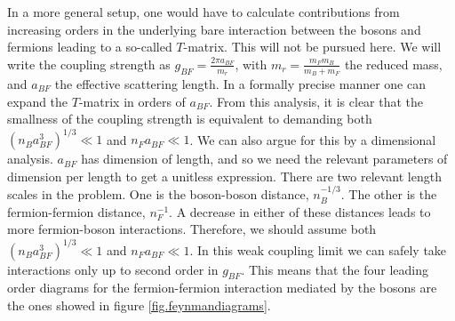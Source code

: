 In a more general setup, one would have to calculate contributions from increasing orders in the underlying bare interaction between the bosons and fermions leading to a so-called $T$-matrix. This will not be pursued here. We will write the coupling strength as $g_{BF} = \frac{2\pi a_{BF}}{m_r}$, with $m_r = \frac{m_Fm_B}{m_B + m_F}$ the reduced mass, and $a_{BF}$ the effective scattering length. In a formally precise manner one can expand the $T$-matrix in orders of $a_{BF}$. From this analysis, it is clear that the smallness of the coupling strength is equivalent to demanding both $(n_Ba_{BF}^3)^{1/3}\ll 1$ and $n_Fa_{BF} \ll 1$. We can also argue for this by a dimensional analysis. $a_{BF}$ has dimension of length, and so we need the relevant parameters of dimension per length to get a unitless expression. There are two relevant length scales in the problem. One is the boson-boson distance, $n_B^{-1/3}$. The other is the fermion-fermion distance, $n_F^{-1}$. A decrease in either of these distances leads to more fermion-boson interactions. Therefore, we should assume both $(n_Ba_{BF}^3)^{1/3} \ll 1$ and $n_Fa_{BF}\ll 1$. In this weak coupling limit we can safely take interactions only up to second order in $g_{BF}$. This means that the four leading order diagrams for the fermion-fermion interaction mediated by the bosons are the ones showed in figure \ref{fig.feynmandiagrams}. 

